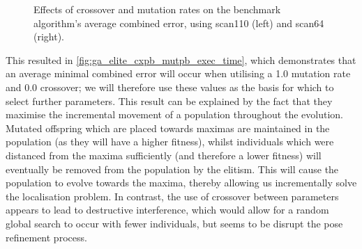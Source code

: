 \documentclass[authoryearcitations]{UoYCSproject}
\begin{document}
\begin{figure}
\begin{subfigure}[b]{0.5\textwidth}
\end{subfigure}
\begin{subfigure}[b]{0.5\textwidth}
\end{subfigure}
	\caption[Optimising crossover \& mutation rates for elitist selection.]{Effects of crossover and mutation rates on the benchmark algorithm's average combined error, using scan110 (left) and scan64 (right).}
	\label{fig:ga_elite_cxpb_mutpb_exec_time}
\end{figure}

This resulted in \autoref{fig:ga_elite_cxpb_mutpb_exec_time}, which demonstrates that an average minimal combined error will occur when utilising a 1.0 mutation rate and 0.0 crossover; we will therefore use these values as the basis for which to select further parameters. This result can be explained by the fact that they maximise the incremental movement of a population throughout the evolution. Mutated offspring which are placed towards maximas are maintained in the population (as they will have a higher fitness), whilst individuals which were distanced from the maxima sufficiently (and therefore a lower fitness) will eventually be removed from the population by the elitism. This will cause the population to evolve towards the maxima, thereby allowing us incrementally solve the localisation problem. In contrast, the use of crossover between parameters appears to lead to destructive interference, which would allow for a random global search to occur with fewer individuals, but seems to be disrupt the pose refinement process.
\end{document}
